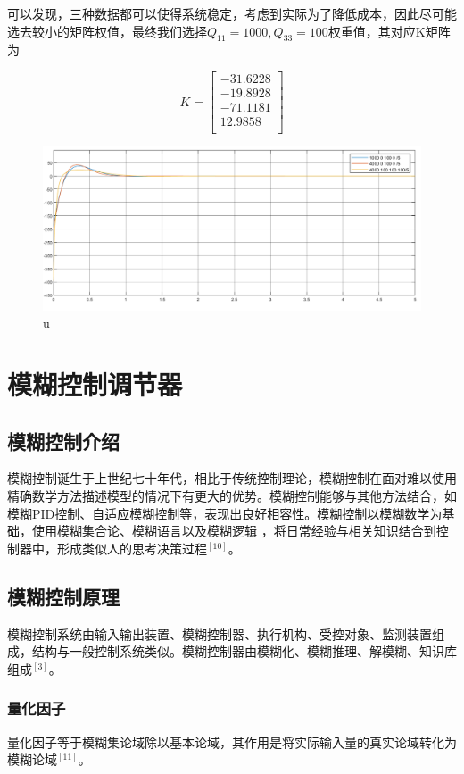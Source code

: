 可以发现，三种数据都可以使得系统稳定，考虑到实际为了降低成本，因此尽可能选去较小的矩阵权值，最终我们选择$Q_{11}=1000,Q_{33}=100$权重值，其对应K矩阵为

\begin{equation}
K=
\begin{bmatrix}
-31.6228\\
-19.8928\\
-71.1181\\
12.9858\\
\end{bmatrix}
\end{equation}


\begin{figure}[hbpt]
\centering
\includegraphics[width=12cm]{u.png}
\caption{u}\label{u}
\end{figure}



\chapter{模糊控制调节器}

\section{模糊控制介绍}
模糊控制诞生于上世纪七十年代，相比于传统控制理论，模糊控制在面对难以使用精确数学方法描述模型的情况下有更大的优势。模糊控制能够与其他方法结合，如模糊PID控制、自适应模糊控制等，表现出良好相容性。模糊控制以模糊数学为基础，使用模糊集合论、模糊语言以及模糊逻辑 ，将日常经验与相关知识结合到控制器中，形成类似人的思考决策过程$^{[10]}$。

\section{模糊控制原理}
模糊控制系统由输入输出装置、模糊控制器、执行机构、受控对象、监测装置组成，结构与一般控制系统类似。模糊控制器由模糊化、模糊推理、解模糊、知识库组成$^{[3]}$。
\subsection{量化因子}
量化因子等于模糊集论域除以基本论域，其作用是将实际输入量的真实论域转化为模糊论域$^{[11]}$。
